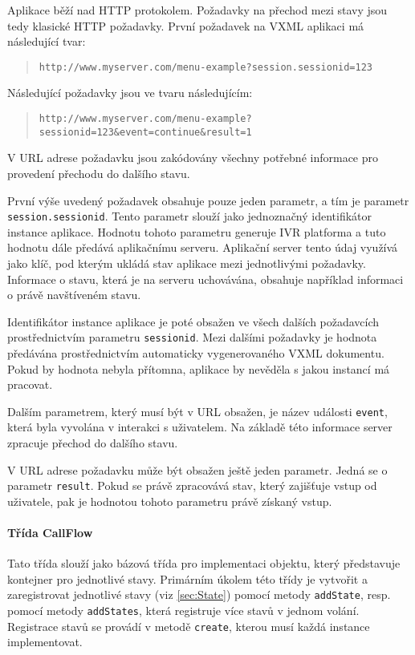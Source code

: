 \documentclass[ing,male,java,dept460,twoside]{diploma}						%
\begin{document}
Aplikace běží nad HTTP protokolem. Požadavky na přechod mezi stavy jsou tedy klasické HTTP požadavky. První požadavek na VXML aplikaci má následující tvar:

\begin{quote}
\begin{sloppypar}
	\texttt{http://www.myserver.com/menu-example?session.sessionid=123}
\end{sloppypar}
\end{quote}

Následující požadavky jsou ve tvaru následujícím:

\begin{quote}
\begin{sloppypar}
	\texttt{http://www.myserver.com/menu-example?sessionid=123\allowbreak\&event=continue\&result=1}
\end{sloppypar}
\end{quote}

V URL adrese požadavku jsou zakódovány všechny potřebné informace pro provedení přechodu do dalšího stavu.

První výše uvedený požadavek obsahuje pouze jeden parametr, a tím je parametr \texttt{session.sessionid}. Tento parametr slouží jako jednoznačný identifikátor instance aplikace. Hodnotu tohoto parametru generuje IVR platforma a tuto hodnotu dále předává aplikačnímu serveru. Aplikační server tento údaj využívá jako klíč, pod kterým ukládá stav aplikace mezi jednotlivými požadavky. Informace o stavu, která je na serveru uchovávána, obsahuje například informaci o právě navštíveném stavu.

Identifikátor instance aplikace je poté obsažen ve všech dalších požadavcích prostřednictvím parametru \texttt{sessionid}. Mezi dalšími požadavky je hodnota předávána prostřednictvím automaticky vygenerovaného VXML dokumentu. Pokud by hodnota nebyla přítomna, aplikace by nevěděla s jakou instancí má pracovat.

Dalším parametrem, který musí být v URL obsažen, je název události \texttt{event}, která byla vyvolána v interakci s uživatelem. Na základě této informace server zpracuje přechod do dalšího stavu.

V URL adrese požadavku může být obsažen ještě jeden parametr. Jedná se o parametr \texttt{result}. Pokud se právě zpracovává stav, který zajišťuje vstup od uživatele, pak je hodnotou tohoto parametru právě získaný vstup.

\paragraph{Třída CallFlow}
\label{sec:CallFlow}
Tato třída slouží jako bázová třída pro implementaci objektu, který představuje kontejner pro jednotlivé stavy. Primárním úkolem této třídy je vytvořit a zaregistrovat jednotlivé stavy (viz \ref{sec:State}) pomocí metody \texttt{addState}, resp. pomocí metody \texttt{addStates}, která registruje více stavů v jednom volání. Registrace stavů se provádí v metodě \texttt{create}, kterou musí každá instance implementovat.
\end{document}
